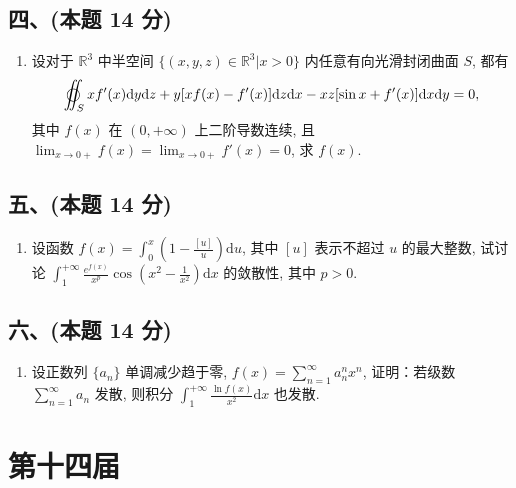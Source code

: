 \subsection*{四、(本题 14 分)}
\begin{enumerate}[start=8]
    \item 设对于 $\mathbb{R}^3$ 中半空间 $\{(x,  y,  z) \in \mathbb{R}^3 | x > 0\}$ 内任意有向光滑封闭曲面 $S$, 都有 \[ \varoiint_{S} xf'(x)\mathrm{d}y\mathrm{d}z + y[xf(x) - f'(x)]\mathrm{d}z\mathrm{d}x - xz[\sin x + f'(x)]\mathrm{d}x\mathrm{d}y = 0 , \]其中 $f(x)$ 在 $(0,  +\infty)$ 上二阶导数连续, 且 $ \displaystyle\lim_{x \to 0+} f(x) = \displaystyle\lim_{x \to 0+} f'(x) = 0 $, 求 $f(x)$.
\end{enumerate}

\subsection*{五、(本题 14 分)}
\begin{enumerate}[start=9]
    \item 设函数 $f(x) = \displaystyle\int_0^x \left(1 - \frac{[u]}{u}\right) \mathrm{d}u$, 其中 $[u]$ 表示不超过 $u$ 的最大整数, 试讨论 $\displaystyle \int_1^{+\infty} \frac{e^{f(x)}}{x^p} \cos \left(x^2 - \frac{1}{x^2}\right) \mathrm{d}x $ 的敛散性, 其中 $p > 0$.
\end{enumerate}

\subsection*{六、(本题 14 分)}
\begin{enumerate}[start=10]
    \item 设正数列 $\{a_n\}$ 单调减少趋于零, $f(x) = \displaystyle\sum_{n=1}^\infty a_n^n x^n$, 证明：若级数 $\sum_{n=1}^\infty a_n$ 发散, 则积分 $\displaystyle\int_1^{+\infty} \frac{\ln f(x)}{x^2} \mathrm{d}x $ 也发散.
\end{enumerate}


\newpage
\section{第十四届}

